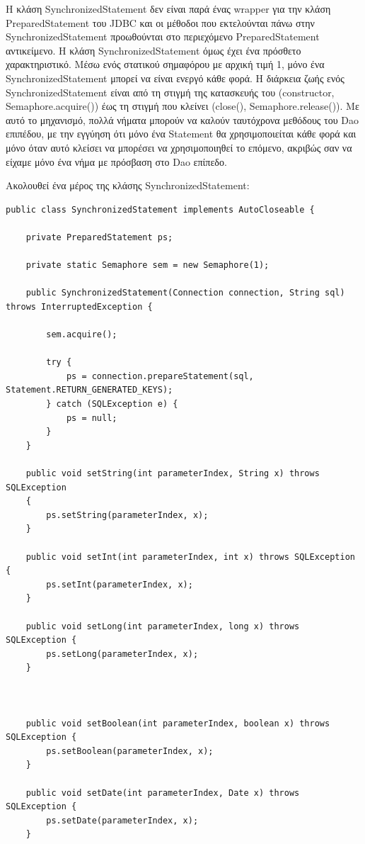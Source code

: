 \documentclass[a4paper,11pt]{article}
\begin{document}
\begin{sloppypar}
Η κλάση SynchronizedStatement δεν είναι παρά ένας wrapper για την κλάση PreparedStatement του JDBC και οι μέθοδοι που εκτελούνται πάνω στην SynchronizedStatement προωθούνται στο περιεχόμενο PreparedStatement αντικείμενο. Η κλάση SynchronizedStatement όμως έχει ένα πρόσθετο χαρακτηριστικό. Μέσω ενός στατικού σημαφόρου με αρχική τιμή 1, μόνο ένα SynchronizedStatement μπορεί να είναι ενεργό κάθε φορά. Η διάρκεια ζωής ενός SynchronizedStatement είναι από τη στιγμή της κατασκευής του (constructor, Semaphore.acquire()) έως τη στιγμή που κλείνει (close(), Semaphore.release()). Με αυτό το μηχανισμό, πολλά νήματα μπορούν να καλούν ταυτόχρονα μεθόδους του Dao επιπέδου, με την εγγύηση ότι μόνο ένα Statement θα χρησιμοποιείται κάθε φορά και μόνο όταν αυτό κλείσει να μπορέσει να χρησιμοποιηθεί το επόμενο, ακριβώς σαν να είχαμε μόνο ένα νήμα με πρόσβαση στο Dao επίπεδο.

Ακολουθεί ένα μέρος της κλάσης SynchronizedStatement:

\begin{lstlisting}
public class SynchronizedStatement implements AutoCloseable {

    private PreparedStatement ps;

    private static Semaphore sem = new Semaphore(1);

    public SynchronizedStatement(Connection connection, String sql) throws InterruptedException {

        sem.acquire();

        try {
            ps = connection.prepareStatement(sql, Statement.RETURN_GENERATED_KEYS);
        } catch (SQLException e) {
            ps = null;
        }
    }

    public void setString(int parameterIndex, String x) throws SQLException
    {
        ps.setString(parameterIndex, x);
    }

    public void setInt(int parameterIndex, int x) throws SQLException {
        ps.setInt(parameterIndex, x);
    }

    public void setLong(int parameterIndex, long x) throws SQLException {
        ps.setLong(parameterIndex, x);
    }



    public void setBoolean(int parameterIndex, boolean x) throws SQLException {
        ps.setBoolean(parameterIndex, x);
    }

    public void setDate(int parameterIndex, Date x) throws SQLException {
        ps.setDate(parameterIndex, x);
    }


\end{lstlisting}
\end{sloppypar}
\end{document}
